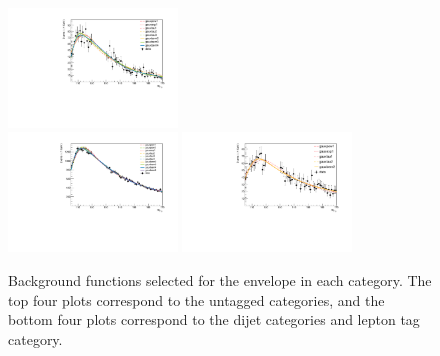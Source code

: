 \begin{figure}
\begin{center}
        \includegraphics[width=0.4\textwidth]{fig/envelope_plots/m105_170_cat502_turn_lau.pdf}\\
        \includegraphics[width=0.4\textwidth]{fig/envelope_plots/m105_170_cat503_turn_bern5.pdf}
        \includegraphics[width=0.4\textwidth]{fig/envelope_plots/m105_170_cat6789_turn_lau.pdf}
		\caption{Background functions selected for the envelope in each category.
        The top four plots correspond to the untagged categories, and the bottom four plots correspond to the dijet categories and lepton tag category.}
		\label{fig:bkgmodel_e}
	\end{center}
\end{figure}


